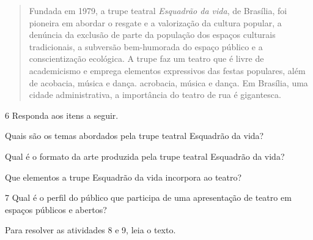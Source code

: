 \begin{quote}
Fundada em 1979, a trupe teatral \emph{Esquadrão da vida}, de Brasília,
foi pioneira em abordar o resgate e a valorização da cultura popular, a
denúncia da exclusão de parte da população dos espaços culturais tradicionais,
a subversão bem-humorada do espaço público e a conscientização ecológica.
A trupe faz um teatro que é livre de academicismo e emprega elementos
expressivos das festas populares, além de acobacia, música e dança.
acrobacia, música e dança. Em Brasília, uma cidade administrativa,
a importância do teatro de rua é gigantesca.

\end{quote}

\num{6}  Responda aos itens a seguir.

\begin{escolha}
\item Quais são os temas abordados pela trupe teatral Esquadrão da vida?\\

\item Qual é o formato da arte produzida pela trupe teatral Esquadrão da vida?\\

\item Que elementos a trupe Esquadrão da vida incorpora ao teatro?\\
\end{escolha}

\num{7} Qual é o perfil do público que participa de uma apresentação de teatro em espaços públicos e abertos?


\pagebreak

Para resolver as atividades 8 e 9, leia o texto.\bigskip

